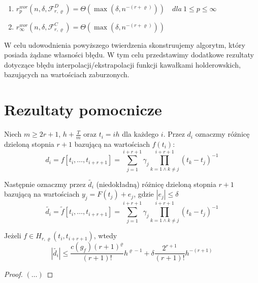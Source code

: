 \documentclass[oik, pdftex, robocza, man]{mgrwms}
\begin{document}
\begin{thm}
\label{AoP_tw1}~ %
    \begin{enumerate}
        \item $r^{wor}_{p}(n, \delta, \mathcal{F}^{D}_{r,\varrho}) = \Theta(\max(\delta, n^{-(r+\varrho)})) \quad dla \: 1 \leq p \leq \infty$
        \item $r^{wor}_{\infty}(n, \delta, \mathcal{F}^{C}_{r,\varrho}) = \Theta(\max(\delta, n^{-(r+\varrho)}))$
    \end{enumerate}
\end{thm}

W celu udowodnienia powyższego twierdzenia skonstruujemy algorytm, który posiada żądane własności błędu. W tym celu przedstawimy dodatkowe rezultaty dotyczące błędu interpolacji/ekstrapolacji funkcji kawałkami holderowskich, bazujących na wartościach zaburzonych.

\section{Rezultaty pomocnicze}

Niech $m \geq 2r + 1$, $h + \frac{T}{m}$ oraz $t_{i} = ih$ dla każdego $i$. Przez $d_{i}$ oznaczmy różnicę dzieloną stopnia $r+1$ bazującą na wartościach $f(t_{i})$:
\begin{equation*}
    d_{i} = f[t_{i}, \dots, t_{i+r+1}] = \sum_{j = 1}^{i+r+1} \gamma_{j} \prod_{k=1 \land k \neq j}^{i+r+1}(t_{k}-t_{j})^{-1}
\end{equation*}

Następnie oznaczmy przez $\tilde{d_i}$ (niedokładną) różnicę dzieloną stopnia $r+1$ bazującą na wartościach $y_{j} = F(t_{j}) + e_{j}$, gdzie $|e_{j}| \leq \delta$
\begin{equation*}
    \tilde{d_{i}} = \tilde{f}[t_{i}, \dots, t_{i+r+1}] = \sum_{j = 1}^{i+r+1} \gamma_{j} \prod_{k=1 \land k \neq j}^{i+r+1}(t_{k}-t_{j})^{-1}
\end{equation*}

\begin{lemma}
    Jeżeli $f \in H_{r, \varrho}(t_{i}, t_{i+r+1})$, wtedy
    \begin{equation*}
        |\tilde{d_{i}}| \leq \frac{c(g_{f})(r+1)^{\varrho}}{(r+1)!} h^{\varrho-1} + \delta \frac{2^{r+1}}{(r+1)!} h^{-(r+1)}
    \end{equation*}
\end{lemma}
\begin{proof}
    $(\dots)$
\end{proof}
\end{document}
